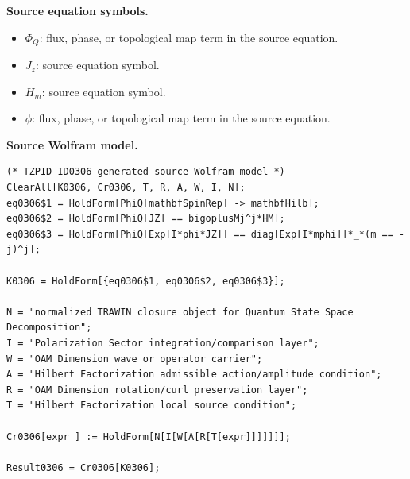 \begin{minipage}[t]{0.49\linewidth}
\begingroup
\small
\raggedright
\textbf{Source equation symbols.}\par
\begin{itemize}[leftmargin=1.35em,itemsep=1pt,topsep=1pt,parsep=0pt]
    \item $\Phi_Q$: flux, phase, or topological map term in the source equation.
    \item $J_z$: source equation symbol.
    \item $H_m$: source equation symbol.
    \item $\phi$: flux, phase, or topological map term in the source equation.
\end{itemize}
\endgroup
\end{minipage}\hfill
\begin{minipage}[t]{0.47\linewidth}
\begingroup
\scriptsize
\raggedright
\textbf{Source Wolfram model.}\par
\begin{Verbatim}[fontsize=\tiny,breaklines=true,breakanywhere=true]
(* TZPID ID0306 generated source Wolfram model *)
ClearAll[K0306, Cr0306, T, R, A, W, I, N];
eq0306$1 = HoldForm[PhiQ[mathbfSpinRep] -> mathbfHilb];
eq0306$2 = HoldForm[PhiQ[JZ] == bigoplusMj^j*HM];
eq0306$3 = HoldForm[PhiQ[Exp[I*phi*JZ]] == diag[Exp[I*mphi]]*_*(m == -j)^j];

K0306 = HoldForm[{eq0306$1, eq0306$2, eq0306$3}];

N = "normalized TRAWIN closure object for Quantum State Space Decomposition";
I = "Polarization Sector integration/comparison layer";
W = "OAM Dimension wave or operator carrier";
A = "Hilbert Factorization admissible action/amplitude condition";
R = "OAM Dimension rotation/curl preservation layer";
T = "Hilbert Factorization local source condition";

Cr0306[expr_] := HoldForm[N[I[W[A[R[T[expr]]]]]]];

Result0306 = Cr0306[K0306];
\end{Verbatim}
\endgroup
\end{minipage}

